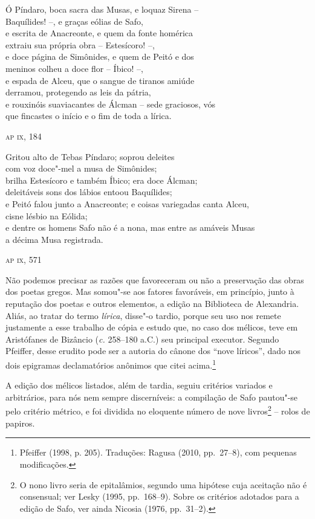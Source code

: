 \epigraph{Ó Píndaro, boca sacra das Musas, e loquaz Sirena -- \\
Baquílides! --, e graças eólias de Safo, \\
e escrita de Anacreonte, e quem da fonte homérica \\
extraiu sua própria obra -- Estesícoro! --, \\
e doce página de Simônides, e quem de Peitó\footnotemark[108]{} e dos \\
meninos colheu a doce flor -- Íbico! --, \\
e espada de Alceu, que o sangue de tiranos amiúde \\
derramou, protegendo as leis da pátria, \\
e rouxinóis suaviacantes de Álcman -- sede \qb{}graciosos, vós \\
que fincastes o início e o fim de toda a lírica.}{\textsc{ap ix}, 184}

\setcounter{footnote}{108}

\epigraph{Gritou alto de Tebas Píndaro; soprou deleites \\
com voz doce"-mel a musa de Simônides; \\
brilha Estesícoro e também Íbico; era doce Álcman; \\
deleitáveis sons dos lábios entoou Baquílides; \\
e Peitó falou junto a Anacreonte; e coisas variegadas canta Alceu,\\
cisne lésbio na Eólida; \\
e dentre os homens Safo não é a nona, mas entre as amáveis Musas\\
a décima Musa registrada.}{\textsc{ap ix}, 571}


Não podemos precisar as razões que favoreceram ou não a
preservação das obras dos poetas gregos. Mas somou"-se aos fatores favoráveis,
em princípio, junto à reputação dos poetas e outros elementos, a edição na
Biblioteca de Alexandria. Aliás, ao tratar do termo \textit{lírica}, disse"-o
tardio, porque seu uso nos remete justamente a esse trabalho de cópia e estudo
que, no caso dos mélicos, teve em Aristófanes de Bizâncio
(\textit{c.} 258--180 a.C.) seu principal executor. Segundo Pfeiffer, desse
erudito pode ser a autoria do cânone dos “nove líricos”,
dado nos dois epigramas declamatórios anônimos que citei
acima.\footnote{Pfeiffer (1998, p. 205). Traduções: Ragusa (2010, pp.~27--8), com pequenas modificações.}

A edição dos mélicos listados, além de tardia, seguiu critérios variados e
arbitrários, para nós nem sempre discerníveis: a compilação de Safo pautou"-se
pelo critério métrico, e foi dividida no eloquente número de nove
livros\footnote{ O nono livro seria de epitalâmios, segundo uma hipótese cuja
aceitação não é consensual; ver Lesky (1995, pp.~168--9). Sobre os critérios
adotados para a edição de Safo, ver ainda Nicosia (1976, pp.~31--2).}  -- rolos de papiros.

